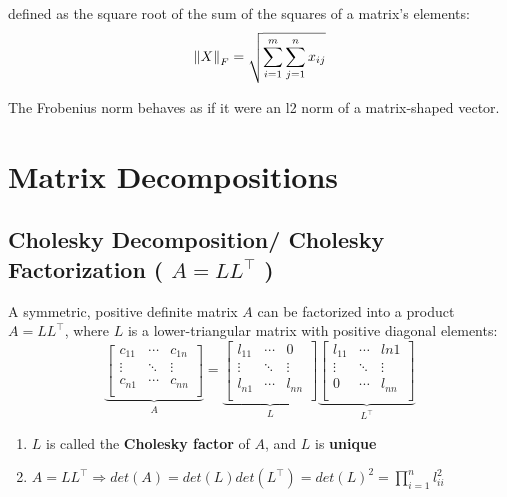 defined as the square root of the sum of the squares of a matrix’s elements:
\[
    \displaystyle
    \left\| X \right\|_F = \sqrt{
        \sum_{i=1}^{m} \sum_{j=1}^{n} x_{ij}
    }
\]

The Frobenius norm behaves as if it were an l2 norm of a matrix-shaped vector.


\section{Matrix Decompositions}

\subsection{Cholesky Decomposition/ Cholesky Factorization ( $A = LL^\top$ ) \cite{mfml-1}}\label{Cholesky Decomposition/ Cholesky Factorization}

A symmetric, positive definite matrix $A$ can be factorized into a product $A = LL^\top$, where $L$ is a lower-triangular matrix with positive diagonal elements:
\[
    \displaystyle
    \underset{\displaystyle A}{
      \underbrace{
        \begin{bmatrix}
              c_{11} & \cdots & c_{1n} \\
              \vdots & \ddots & \vdots \\
              c_{n1} & \cdots & c_{nn}\\
          \end{bmatrix}
      }
   }
   =
   \underset{\displaystyle L}{
      \underbrace{
          \begin{bmatrix}
              l_{11} & \cdots & 0 \\
              \vdots & \ddots & \vdots \\
              l_{n1} & \cdots & l_{nn}\\
          \end{bmatrix}
      }
   }
   \underset{\displaystyle L^\top}{
        \underbrace{
              \begin{bmatrix}
                  l_{11} & \cdots & l{n1} \\
                  \vdots & \ddots & \vdots \\
                  0 & \cdots & l_{nn}\\
              \end{bmatrix}
        }
    }
\]

\begin{enumerate}
    \item $L$ is called the \textbf{Cholesky factor} of $A$, and $L$ is \textbf{unique}

    \item $\displaystyle A = LL^\top \Rightarrow det(A) = det(L)det(L^\top) = det(L)^2 = \prod_{i=1}^{n} l_{ii}^2$
\end{enumerate}

